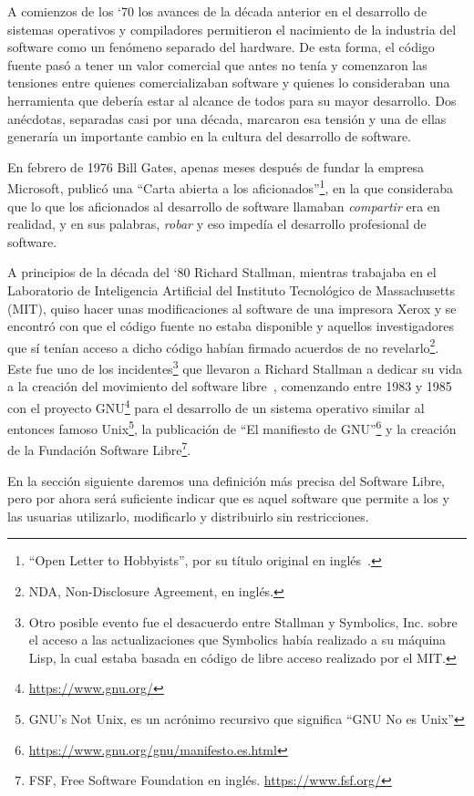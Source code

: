 A comienzos de los `70 los avances de la década anterior en el desarrollo de sistemas operativos y compiladores permitieron el nacimiento de la industria del software como un fenómeno separado del hardware. De esta forma, el código fuente pasó a tener un valor comercial que antes no tenía y comenzaron las tensiones entre quienes comercializaban software y quienes lo consideraban una herramienta que debería estar al alcance de todos para su mayor desarrollo. Dos anécdotas, separadas casi por una década, marcaron esa tensión y una de ellas generaría un importante cambio en la cultura del desarrollo de software.

En febrero de 1976 Bill Gates, apenas meses después de fundar la empresa Microsoft, publicó una ``Carta abierta a los aficionados''\footnote{``Open Letter to Hobbyists'', por su título original en inglés~\cite{gates76}.}, en la que consideraba que lo que los aficionados al desarrollo de software llamaban \emph{compartir} era en realidad, y en sus palabras, \emph{robar} y eso impedía el desarrollo profesional de software. 

A principios de la década del `80 Richard Stallman, mientras trabajaba en el Laboratorio de Inteligencia Artificial del Instituto Tecnológico de Massachusetts (MIT), quiso hacer unas modificaciones al software de una impresora Xerox y se encontró con que el código fuente no estaba disponible y aquellos investigadores que sí tenían acceso a dicho código habían firmado acuerdos de no revelarlo\footnote{NDA, Non-Disclosure Agreement, en inglés.}. Este fue uno de los incidentes\footnote{Otro posible evento fue el desacuerdo entre Stallman y Symbolics, Inc. sobre el acceso a las actualizaciones que Symbolics había realizado a su máquina Lisp, la cual estaba basada en código de libre acceso realizado por el MIT.} que llevaron a Richard Stallman a dedicar su vida a la creación del movimiento del software libre~\cite{williams02}, comenzando entre 1983 y 1985 con el proyecto GNU\footnote{\url{https://www.gnu.org/}} para el desarrollo de un sistema operativo similar al entonces famoso Unix\footnote{GNU's Not Unix, es un acrónimo recursivo que significa ``GNU No es Unix''}, la publicación de ``El manifiesto de GNU''\footnote{\url{https://www.gnu.org/gnu/manifesto.es.html}} y la creación de la Fundación Software Libre\footnote{FSF, Free Software Foundation en inglés. \url{https://www.fsf.org/}}.

En la sección siguiente daremos una definición más precisa del Software Libre, pero por ahora será suficiente indicar que es aquel software que permite a los y las usuarias utilizarlo, modificarlo y distribuirlo sin restricciones.

